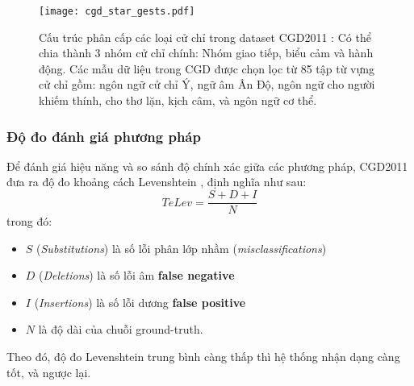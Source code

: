 \begin{figure}
\centering
\texttt{[image: cgd\_star\_gests.pdf]}
\caption{Cấu trúc phân cấp các loại cử chỉ trong dataset CGD2011 \cite{chalearn_dataset}: Có thể chia thành 3 nhóm cử chỉ chính: Nhóm giao tiếp, biểu cảm và hành động. Các mẫu dữ liệu trong CGD được chọn lọc từ 85 tập từ vựng cử chỉ gồm: ngôn ngữ cử chỉ Ý, ngữ âm Ân Độ, ngôn ngữ cho người khiếm thính, cho thơ lặn, kịch câm, và ngôn ngữ cơ thể.}
\label{fig_cgd_star}
\end{figure}

\subsubsection{Độ đo đánh giá phương pháp}
Để đánh giá hiệu năng và so sánh độ chính xác giữa các phương pháp, CGD2011 đưa ra độ đo khoảng cách Levenshtein \cite{Leven_dist}, định nghĩa như sau: 
\begin{equation}
TeLev = \frac{{S + D + I}}{N}
\end{equation}
trong đó: 
\begin{itemize}
\item \(S\) (\textit{Substitutions}) là số lỗi phân lớp nhầm (\textit{misclassifications})
\item \(D\) (\textit{Deletions}) là số lỗi âm \textbf{false negative}
\item \(I\) (\textit{Insertions}) là số lỗi dương \textbf{false positive}
\item \(N\) là độ dài của chuỗi ground-truth.
\end{itemize}
Theo đó, độ đo Levenshtein trung bình càng thấp thì hệ thống nhận dạng càng tốt, và ngược lại. 

